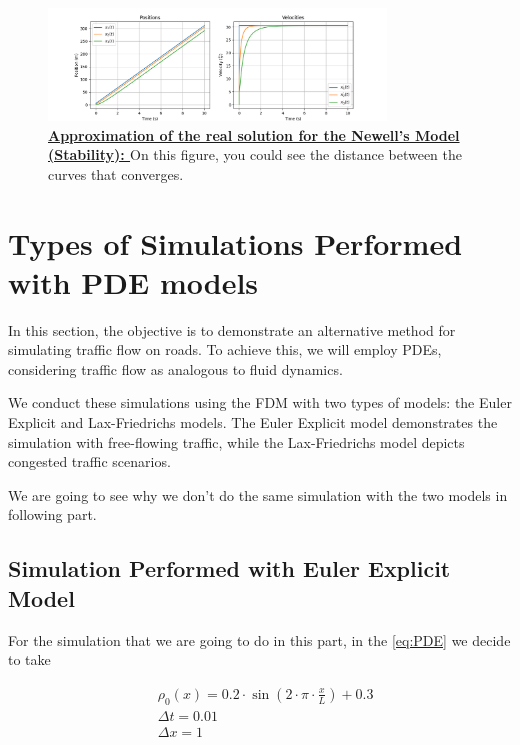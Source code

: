 \documentclass{article}
\begin{document}
	 
	 \begin{figure}[H]
	 	\centering
	 	\includegraphics[width=0.8\textwidth]{RealSol1.png}
	 	\caption[Approximation of the real solution for the Newell's Model (Stability)]{\textbf{\underline{Approximation of the real solution for the Newell's Model (Stability): }} On this figure, you could see the distance between the curves that converges.}
	 	\label{fig:SE5}
	 \end{figure}
	
	
	
	\section{Types of Simulations Performed with PDE models}
	
	In this section, the objective is to demonstrate an alternative method for simulating traffic flow on roads. To achieve this, we will employ PDEs, considering traffic flow as analogous to fluid dynamics.
	
	We conduct these simulations using the FDM with two types of models: the Euler Explicit and Lax-Friedrichs models. The Euler Explicit model demonstrates the simulation with free-flowing traffic, while the Lax-Friedrichs model depicts congested traffic scenarios.
	
	We are going to see why we don't do the same simulation with the two models in following part.
	
	
	\subsection{Simulation Performed with Euler Explicit Model}
	
	For the simulation that we are going to do in this part, in the \ref{eq:PDE} we decide to take 
	
	\[
	\boxed{
		\begin{aligned}
			&\rho_0(x)=0.2 \cdot \sin\left(2 \cdot \pi \cdot \frac{x}{L}\right) + 0.3 \\
			&\Delta t = 0.01 \\
			&\Delta x = 1
		\end{aligned}
	}
	\]
	
\end{document}

